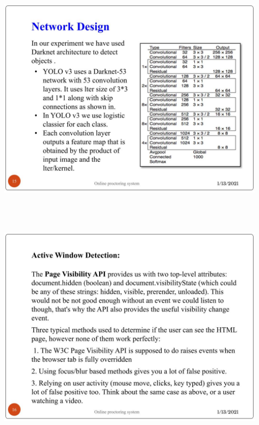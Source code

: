 \documentclass[12pt]{report}
\begin{document}
\includegraphics[width=17cm,height=12cm]{INTERNSHIP SAMPLE PRESENTATION (14)}\\
\includegraphics[width=17cm,height=12cm]{INTERNSHIP SAMPLE PRESENTATION (15)}\\
\end{document}

